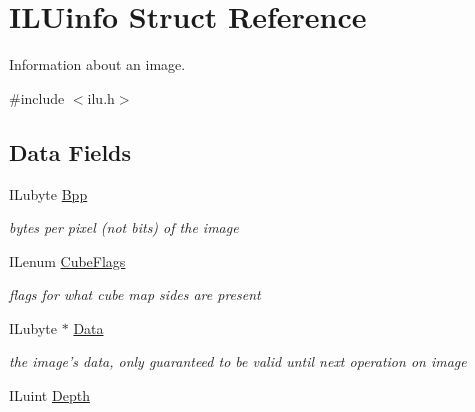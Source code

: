 \hypertarget{struct_i_l_uinfo}{\section{I\+L\+Uinfo Struct Reference}
\label{struct_i_l_uinfo}
}


Information about an image.  




{\ttfamily \#include $<$ilu.\+h$>$}

\subsection*{Data Fields}
\begin{DoxyCompactItemize}
\item 
\hypertarget{struct_i_l_uinfo_acb619433784a0e26c0f1f18b3700c9f7}{I\+Lubyte \hyperlink{struct_i_l_uinfo_acb619433784a0e26c0f1f18b3700c9f7}{Bpp}}\label{struct_i_l_uinfo_acb619433784a0e26c0f1f18b3700c9f7}

\begin{DoxyCompactList}\small\item\em bytes per pixel (not bits) of the image \end{DoxyCompactList}\item 
\hypertarget{struct_i_l_uinfo_a2141dcf3ce36303a8c31d417d9337034}{I\+Lenum \hyperlink{struct_i_l_uinfo_a2141dcf3ce36303a8c31d417d9337034}{Cube\+Flags}}\label{struct_i_l_uinfo_a2141dcf3ce36303a8c31d417d9337034}

\begin{DoxyCompactList}\small\item\em flags for what cube map sides are present \end{DoxyCompactList}\item 
\hypertarget{struct_i_l_uinfo_a32fd28ac5d89e3ef2f9151330af0149d}{I\+Lubyte $\ast$ \hyperlink{struct_i_l_uinfo_a32fd28ac5d89e3ef2f9151330af0149d}{Data}}\label{struct_i_l_uinfo_a32fd28ac5d89e3ef2f9151330af0149d}

\begin{DoxyCompactList}\small\item\em the image's data, only guaranteed to be valid until next operation on image \end{DoxyCompactList}\item 
\hypertarget{struct_i_l_uinfo_a2a4c47a9713bee335a0830b336bdc951}{I\+Luint \hyperlink{struct_i_l_uinfo_a2a4c47a9713bee335a0830b336bdc951}{Depth}}\label{struct_i_l_uinfo_a2a4c47a9713bee335a0830b336bdc951}


\end{DoxyCompactItemize}

